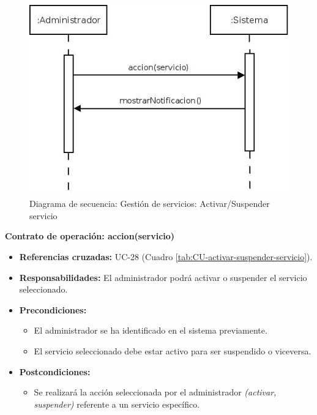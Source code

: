 \begin{figure}[H]
\centering
  \includegraphics[scale=.55]{img/secuencias/gestion-servicios-suspender-activar-servicio.jpeg}
  \caption{Diagrama de secuencia: Gestión de servicios: Activar/Suspender servicio}
  \label{fig:secuencia-gestion-servicios-suspender-activar-servicio}
\end{figure}

\textbf{Contrato de operación: accion(servicio)}
\begin{itemize}
\item \textbf{Referencias cruzadas:} UC-28 (Cuadro \ref{tab:CU-activar-suspender-servicio}).
\item \textbf{Responsabilidades:} El administrador podrá activar o suspender el servicio seleccionado.
\item \textbf{Precondiciones:} 
 \begin{itemize}
\item El administrador se ha identificado en el sistema previamente.
\item El servicio seleccionado debe estar activo para ser suspendido o viceversa.
\end {itemize}
\item \textbf{Postcondiciones:} 
 \begin{itemize}
\item Se realizará la acción seleccionada por el administrador \textit{(activar, suspender)} referente a un servicio específico.
\end {itemize}
\end {itemize}

